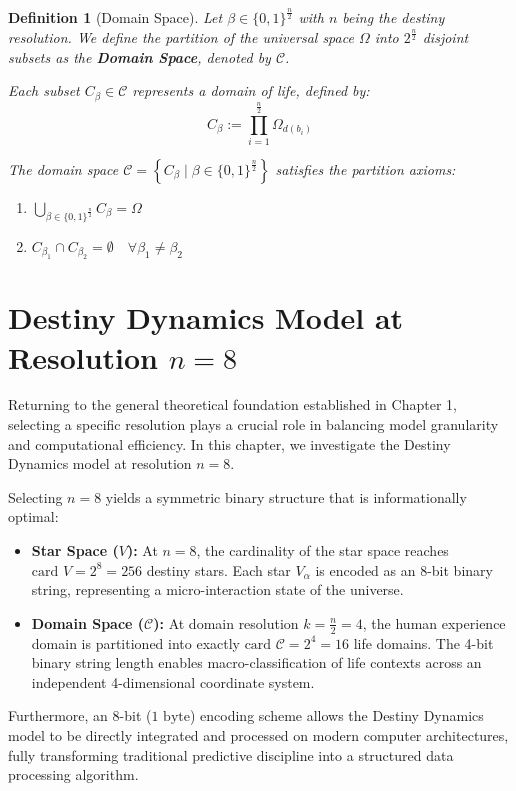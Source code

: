 \documentclass[a4paper,14pt, twoside]{memoir}
\newtheorem{definition}{Definition}[chapter]
\begin{document}
\begin{definition}[Domain Space]
	Let $\beta \in \{0,1\}^{\frac{n}{2}}$ with $n$ being the destiny resolution. We define the partition of the universal space $\Omega$ into $2^{\frac{n}{2}}$ disjoint subsets as the \textbf{Domain Space}, denoted by $\mathcal{C}$.

	Each subset $C_\beta \in \mathcal{C}$ represents a domain of life, defined by:
	$$C_\beta := \prod_{i=1}^{\frac{n}{2}} \Omega_{d(b_i)}$$

	The domain space $\mathcal{C} = \left\{ C_\beta \mid \beta \in \{0,1\}^{\frac{n}{2}} \right\}$ satisfies the partition axioms:
	\begin{enumerate}[label=\roman*)]
		\item $\bigcup_{\beta \in \{0,1\}^{\frac{n}{2}}} C_\beta = \Omega$
		\item $C_{\beta_1} \cap C_{\beta_2} = \emptyset \quad \forall \beta_1 \neq \beta_2$
	\end{enumerate}
\end{definition}

\chapter{Destiny Dynamics Model at Resolution $n=8$}
Returning to the general theoretical foundation established in Chapter 1, selecting a specific resolution plays a crucial role in balancing model granularity and computational efficiency. In this chapter, we investigate the Destiny Dynamics model at resolution $n = 8$.

Selecting $n = 8$ yields a symmetric binary structure that is informationally optimal:
\begin{itemize}
	\item \textbf{Star Space ($V$):} At $n = 8$, the cardinality of the star space reaches $\text{card } V = 2^8 = 256$ destiny stars. Each star $V_\alpha$ is encoded as an 8-bit binary string, representing a micro-interaction state of the universe.
	\item \textbf{Domain Space ($\mathcal{C}$):} At domain resolution $k = \frac{n}{2} = 4$, the human experience domain is partitioned into exactly $\text{card } \mathcal{C} = 2^4 = 16$ life domains. The 4-bit binary string length enables macro-classification of life contexts across an independent 4-dimensional coordinate system.
\end{itemize}

Furthermore, an 8-bit ($1\text{ byte}$) encoding scheme allows the Destiny Dynamics model to be directly integrated and processed on modern computer architectures, fully transforming traditional predictive discipline into a structured data processing algorithm.
\end{document}
